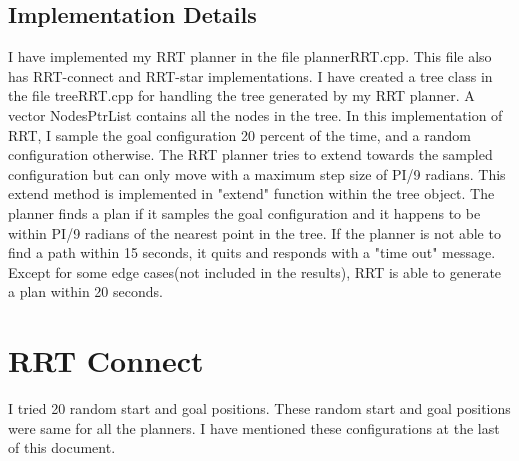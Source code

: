 \documentclass[12pt]{article}
\begin{document}
\subsection{Implementation Details}
I have implemented my RRT planner in the file plannerRRT.cpp. This file also has RRT-connect and RRT-star implementations. I have created a tree class in the file treeRRT.cpp for handling the tree generated by my RRT planner. A vector NodesPtrList contains all the nodes in the tree. In this implementation of RRT, I sample the goal configuration 20 percent of the time, and a random configuration otherwise. The RRT planner tries to extend towards the sampled configuration but can only move with a maximum step size of PI/9 radians. This extend method is implemented in "extend" function within the tree object. The planner finds a plan if it samples the goal configuration and it happens to be within PI/9 radians of the nearest point in the tree. If the planner is not able to find a path within 15 seconds, it quits and responds with a "time out" message. Except for some edge cases(not included in the results), RRT is able to generate a plan within 20 seconds.

\section{RRT Connect}
I tried 20 random start and goal positions. These random start and goal positions were same for all the planners. I have mentioned these configurations at the last of this document. 
\end{document}
